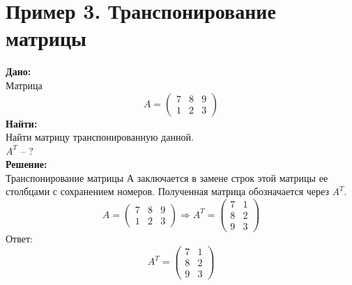\documentclass[a4paper,12pt]{article} %
\begin{document}
\section{Пример 3. Транспонирование матрицы}
\textbf{Дано:} \\
Матрица
\begin{displaymath}
A=\begin{pmatrix}
7 & 8 & 9\\
1 & 2 & 3 
\end{pmatrix}
\end{displaymath}
\textbf{Найти:}\\
Найти матрицу транспонированную данной.\\
$A^T$ -- ?\\
\textbf{Решение:}\\
Транспонирование матрицы $А$ заключается в замене строк этой матрицы ее столбцами с сохранением номеров. Полученная матрица обозначается через $A^T$.
\begin{displaymath}
A=\begin{pmatrix}
7 & 8 & 9\\
1 & 2 & 3 
\end{pmatrix}\Rightarrow A^T= \begin{pmatrix}
7 & 1\\
8 & 2\\
9 & 3
\end{pmatrix}
\end{displaymath}
Ответ:\begin{displaymath}
A^T=
\begin{pmatrix}
7 & 1\\
8 & 2\\
9 & 3
\end{pmatrix}
\end{displaymath}
\end{document}
